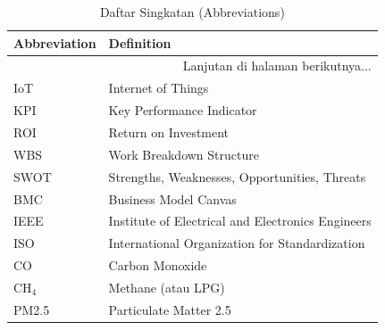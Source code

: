 \documentclass{elsinta}
\begin{document}
\begin{longtable}{|p{4cm}|p{11cm}|} %
    \caption{Daftar Singkatan (Abbreviations)} \label{tab:abbreviations5} \\
    \hline
    \textbf{Abbreviation} & \textbf{Definition} \\
    \hline
    \endhead %
    
    \hline 
    \multicolumn{2}{|r|}{Lanjutan di halaman berikutnya...} \\ 
    \endfoot %
    
    \hline
    \endlastfoot %

    IoT & Internet of Things \\
    \hline
    KPI & Key Performance Indicator \\
    \hline
    ROI & Return on Investment \\
    \hline
    WBS & Work Breakdown Structure \\
    \hline
    SWOT & Strengths, Weaknesses, Opportunities, Threats \\
    \hline
    BMC & Business Model Canvas \\
    \hline
    IEEE & Institute of Electrical and Electronics Engineers \\
    \hline
    ISO & International Organization for Standardization \\   
    \hline
    CO & Carbon Monoxide \\
    \hline
    CH$_4$ & Methane (atau LPG) \\
    \hline
    PM2.5 & Particulate Matter 2.5 \\
    \hline
    

\end{longtable}
\end{document}
